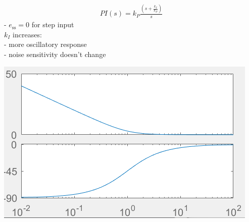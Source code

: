         \begin{minipage}{0.49\linewidth}
            \begin{align*}
                PI(s) = k_P \frac{(s + \frac{k_I}{k_P})}{s}
            \end{align*}
            - $e_{\text{ss}} = 0$ for step input\\
            $k_I$ increases:\\
            - more oscillatory response\\
            - noise sensitivity doesn't change
        \end{minipage}
        \begin{minipage}{0.49\linewidth}
            \includegraphics[width = \linewidth]{src/images/PI-controller.png}
        \end{minipage}

